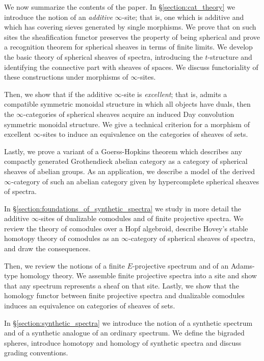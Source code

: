 \documentclass[oneside,a4paper]{amsart}
\theoremstyle{plain}
\theoremstyle{definition}
\theoremstyle{remark}
\begin{document}
We now summarize the contents of the paper. In \S\ref{section:cat_theory} we introduce the notion of an \emph{additive} $\infty$-site; that is, one which is additive and which has covering sieves generated by single morphisms. We prove that on such sites the sheafification functor preserves the property of being spherical and prove a recognition theorem for spherical sheaves in terms of finite limits. We develop the basic theory of spherical sheaves of spectra, introducing the $t$-structure and identifying the connective part with sheaves of spaces. We discuss functoriality of these constructions under morphisms of $\infty$-sites. 

Then, we show that if the additive $\infty$-site is \emph{excellent}; that is, admits a compatible symmetric monoidal structure in which all objects have duals, then the $\infty$-categories of spherical sheaves acquire an induced Day convolution symmetric monoidal structure. We give a technical criterion for a morphism of excellent $\infty$-sites to induce an equivalence on the categories of sheaves of sets. 

Lastly, we prove a variant of a Goerss-Hopkins theorem which describes any compactly generated Grothendieck abelian category as a category of spherical sheaves of abelian groups. As an application, we describe a model of the derived $\infty$-category of such an abelian category given by hypercomplete spherical sheaves of spectra. 

In \S\ref{section:foundations_of_synthetic_spectra} we study in more detail the additive $\infty$-sites of dualizable comodules and of finite projective spectra. We review the theory of comodules over a Hopf algebroid, describe Hovey's stable homotopy theory of comodules as an $\infty$-category of spherical sheaves of spectra, and draw the consequences. 

Then, we review the notions of a finite $E$-projective spectrum and of an Adams-type homology theory. We assemble finite projective spectra into a site and show that any spectrum represents a sheaf on that site. Lastly, we show that the homology functor between finite projective spectra and dualizable comodules induces an equivalence on categories of sheaves of sets. 

In \S\ref{section:synthetic_spectra} we introduce the notion of a synthetic spectrum and of a synthetic analogue of an ordinary spectrum. We define the bigraded spheres, introduce homotopy and homology of synthetic spectra and discuss grading conventions. 
\end{document}
